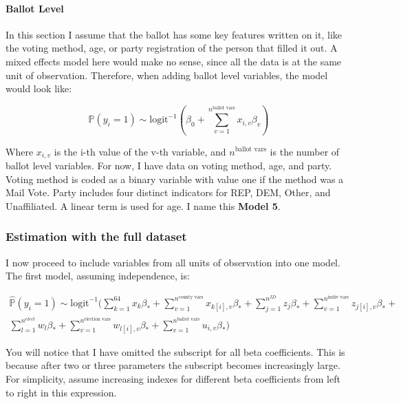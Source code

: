 \documentclass[]{article}
\let\oldparagraph\paragraph
\renewcommand{\paragraph}[1]{\oldparagraph{#1}\mbox{}}
\begin{document}
\paragraph{Ballot Level}\label{ballot-level}

In this section I assume that the ballot has some key features written
on it, like the voting method, age, or party registration of the person
that filled it out. A mixed effects model here would make no sense,
since all the data is at the same unit of observation. Therefore, when
adding ballot level variables, the model would look like:

\begin{equation} \tag{Model 5}
\hat{\mathbb{P}}(y_i = 1) \sim \text{logit}^{-1}(\beta_0 + \sum_{v = 1}^{n^{\text{ballot vars}}}x_{i,v}\beta_{v})
\end{equation}

Where \(x_{i,v}\) is the i-th value of the v-th variable, and
\(n^{\text{ballot vars}}\) is the number of ballot level variables. For
now, I have data on voting method, age, and party. Voting method is
coded as a binary variable with value one if the method was a Mail Vote.
Party includes four distinct indicators for REP, DEM, Other, and
Unaffiliated. A linear term is used for age. I name this \textbf{Model
5}.

\subsubsection{Estimation with the full
dataset}\label{estimation-with-the-full-dataset}

I now proceed to include variables from all units of observation into
one model. The first model, assuming independence, is:

\begin{multline*}
\hat{\mathbb{P}}(y_i = 1) \sim \text{logit}^{-1}(\sum_{k = 1}^{64}x_{k}\beta_{*} + \sum_{v=1}^{n^{\text{county vars}}}x_{k[i], v}\beta_{*} + \sum_{j = 1}^{n^{ID}}z_{j}\beta_{*} + \sum_{v=1}^{n^{\text{indiv vars}}}z_{j[i], v}\beta_{*} + \\
\sum_{l = 1}^{n^{elect}}w_{l}\beta_{*} + \sum_{v=1}^{n^{\text{election vars}}}w_{l[i], v}\beta_{*} + \sum_{v = 1}^{n^{\text{ballot vars}}}u_{i,v}\beta_{*})
\end{multline*}

You will notice that I have omitted the subscript for all beta
coefficients. This is because after two or three parameters the
subscript becomes increasingly large. For simplicity, assume increasing
indexes for different beta coefficients from left to right in this
expression.
\end{document}
